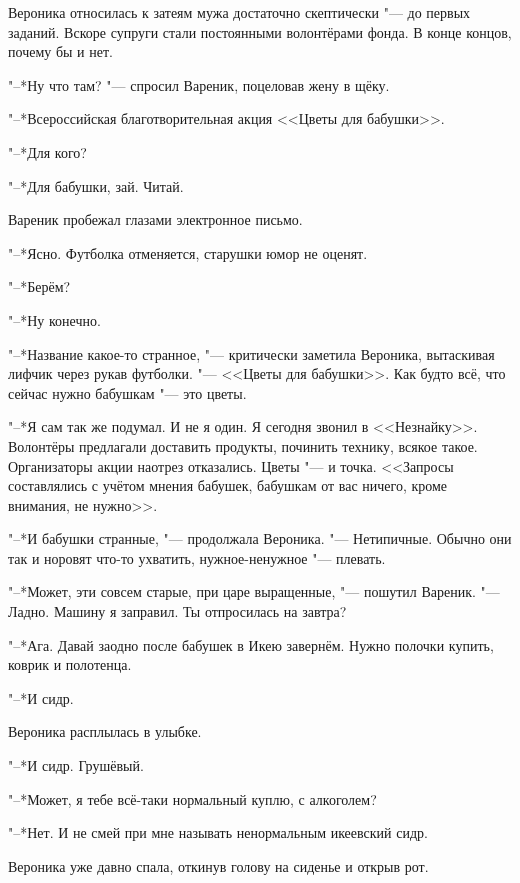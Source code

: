 Вероника относилась к затеям мужа достаточно скептически "--- до первых заданий.
Вскоре супруги стали постоянными волонтёрами фонда.
В конце концов, почему бы и нет.

"--*Ну что там? "--- спросил Вареник, поцеловав жену в щёку.

"--*Всероссийская благотворительная акция <<Цветы для бабушки>>.

"--*Для кого?

"--*Для бабушки, зай.
Читай.

Вареник пробежал глазами электронное письмо.

"--*Ясно.
Футболка отменяется, старушки юмор не оценят.

"--*Берём?

"--*Ну конечно.

\asterism

\textspace

"--*Название какое-то странное, "--- критически заметила Вероника, вытаскивая лифчик через рукав футболки.
"--- <<Цветы для бабушки>>.
Как будто всё, что сейчас нужно бабушкам "--- это цветы.

"--*Я сам так же подумал.
И не я один.
Я сегодня звонил в <<Незнайку>>.
Волонтёры предлагали доставить продукты, починить технику, всякое такое.
Организаторы акции наотрез отказались.
Цветы "--- и точка.
<<Запросы составлялись с учётом мнения бабушек, бабушкам от вас ничего, кроме внимания, не нужно>>.

"--*И бабушки странные, "--- продолжала Вероника.
"--- Нетипичные.
Обычно они так и норовят что-то ухватить, нужное-ненужное "--- плевать.

"--*Может, эти совсем старые, при царе выращенные, "--- пошутил Вареник.
"--- Ладно.
Машину я заправил.
Ты отпросилась на завтра?

"--*Ага.
Давай заодно после бабушек в Икею завернём.
Нужно полочки купить, коврик и полотенца.

"--*И сидр.

Вероника расплылась в улыбке.

"--*И сидр.
Грушёвый.

"--*Может, я тебе всё-таки нормальный куплю, с алкоголем?

"--*Нет.
И не смей при мне называть ненормальным икеевский сидр.

\asterism

\textspace

\label{Sun_2012_05_13}

Вероника уже давно спала, откинув голову на сиденье и открыв рот.

